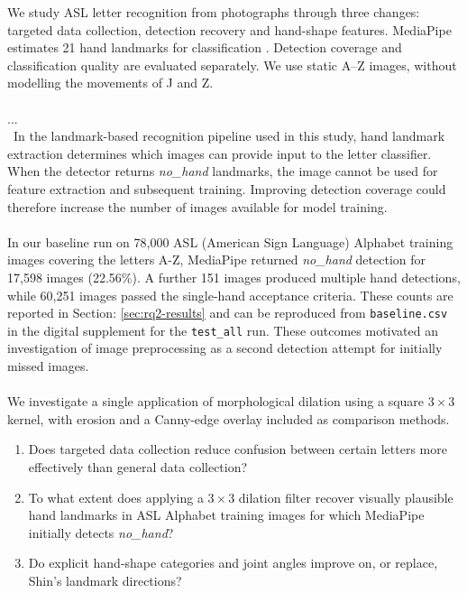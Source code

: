 \documentclass{article}
\begin{document}
We study ASL letter recognition from photographs through three changes: targeted data collection, detection recovery and hand-shape features. MediaPipe estimates 21 hand landmarks for classification \citep{ton-mediapipedocs,ton-shin2021}. Detection coverage and classification quality are evaluated separately. We use static A--Z images, without modelling the movements of J and Z.
\leavevmode \\\\
...
\\\
In the landmark-based recognition pipeline used in this study, hand landmark extraction determines which images can provide input to the letter classifier. When the detector returns \textit{no\_hand} landmarks, the image cannot be used for feature extraction and subsequent training. Improving detection coverage could therefore increase the number of images available for model training.
\\\\
In our baseline run on 78,000 ASL (American Sign Language) Alphabet training images covering the letters A-Z, MediaPipe returned \textit{no\_hand} detection for 17,598 images (22.56\%). A further 151 images produced multiple hand detections, while 60,251 images passed the single-hand acceptance criteria. These counts are reported in Section: \ref{sec:rq2-results}  and can be reproduced from \texttt{baseline.csv} in the digital supplement for the \texttt{test\_all} run. These outcomes motivated an investigation of image preprocessing as a second detection attempt for initially missed images.
\\\\
We investigate a single application of morphological dilation using a square \(3 \times 3\) kernel, with erosion and a Canny-edge overlay included as comparison methods. 





\begin{enumerate}
    \item Does targeted data collection reduce confusion between certain letters more effectively than general data collection?
    \item To what extent does applying a \(3 \times 3\) dilation filter recover visually plausible hand landmarks in ASL Alphabet training images for which MediaPipe initially detects \textit{no\_hand}?
    \item Do explicit hand-shape categories and joint angles improve on, or replace, Shin's landmark directions?
\end{enumerate}
\end{document}
